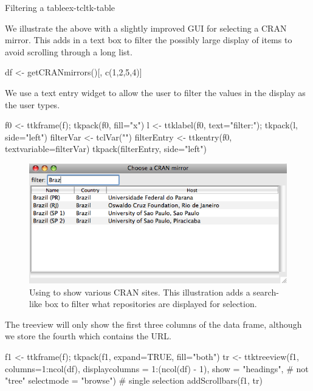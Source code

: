\begin{example}{Filtering a table}{ex-tcltk-table}

We illustrate the above with a slightly improved GUI for selecting a CRAN mirror. This adds in a text box to filter the possibly large display of items to avoid scrolling through a long list. 
\begin{Schunk}
\begin{Sinput}
 df <- getCRANmirrors()[, c(1,2,5,4)]
\end{Sinput}
\end{Schunk}


We use a text entry widget to allow the user to filter the values in the display as the user types.
\begin{Schunk}
\begin{Sinput}
 f0 <- ttkframe(f); tkpack(f0, fill="x")
 l <- ttklabel(f0, text="filter:"); tkpack(l, side="left")
 filterVar <- tclVar("")
 filterEntry <- ttkentry(f0, textvariable=filterVar)
 tkpack(filterEntry, side="left")
\end{Sinput}
\end{Schunk}

\begin{figure}
  \centering
  \includegraphics[width=.8\textwidth]{fig-tcltk-filter-table.png}
  \caption{Using  to show various CRAN sites. This illustration adds a search-like box to filter what repositories are displayed for selection.}
  \label{fig:fig-tcltk-filter-table}
\end{figure}


The treeview  will only show the first three columns of the data frame, although we store the fourth which contains the URL.
\begin{Schunk}
\begin{Sinput}
 f1 <- ttkframe(f); tkpack(f1, expand=TRUE, fill="both")
 tr <- ttktreeview(f1, columns=1:ncol(df), 
                   displaycolumns = 1:(ncol(df) - 1), 
                   show = "headings",     # not "tree" 
                   selectmode = "browse") # single selection
 addScrollbars(f1, tr)
\end{Sinput}
\end{Schunk}


\end{example}
